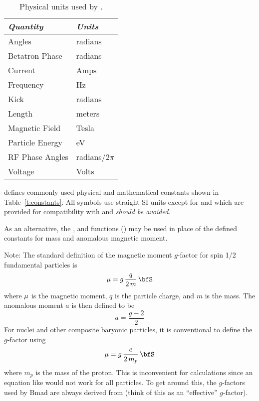 {{{{{\begin{table}[ht]
\centering
\begin{tabular}{ll} \toprule
  {\em Quantity}     & {\em Units}       \\ \midrule
  Angles             &    radians        \\ 
  Betatron Phase     &    radians        \\
  Current            &    Amps           \\ 
  Frequency          &    Hz             \\ 
  Kick               &    radians        \\ 
  Length             &    meters         \\ 
  Magnetic Field     &    Tesla          \\ 
  Particle Energy    &    eV             \\ 
  RF Phase Angles    &    radians/2$\pi$ \\ 
  Voltage            &    Volts          \\ \bottomrule
\end{tabular}
\caption{Physical units used by \bmad.}
\label{t:units}
\end{table}

\bmad defines commonly used physical and mathematical constants shown in Table~\ref{t:constants}.
All symbols use straight SI units except for  and  which are provided for
compatibility with \mad and {\large\em should be avoided}.

As an alternative, the , and  functions
() may be used in place of the defined constants for mass and anomalous
magnetic moment.

Note: The standard definition of the magnetic moment $g$-factor for spin 1/2 fundamental particles is
\begin{equation}
  \Bf\mu = g \, \frac{q}{2 \, m} \, \bfS
  \label{mgq2m}
\end{equation}
where ${\bf \mu}$ is the magnetic moment, $q$ is the particle charge, and $m$ is the mass. The
anomalous moment $a$ is then defined to be
\begin{equation}
  a = \frac{g-2}{2}
\end{equation}
For nuclei and other composite baryonic particles, it is conventional to define the $g$-factor using
\begin{equation}
  \Bf\mu = g \, \frac{e}{2 \, m_p} \, \bfS
  \label{mgq2m2}
\end{equation}
where $m_p$ is the mass of the proton. This is inconvenient for calculations since an equation like
 would not work for all particles. To get around this, the $g$-factors used by Bmad are
always derived from  (think of this as an ``effective'' $g$-factor).

}}}}}
